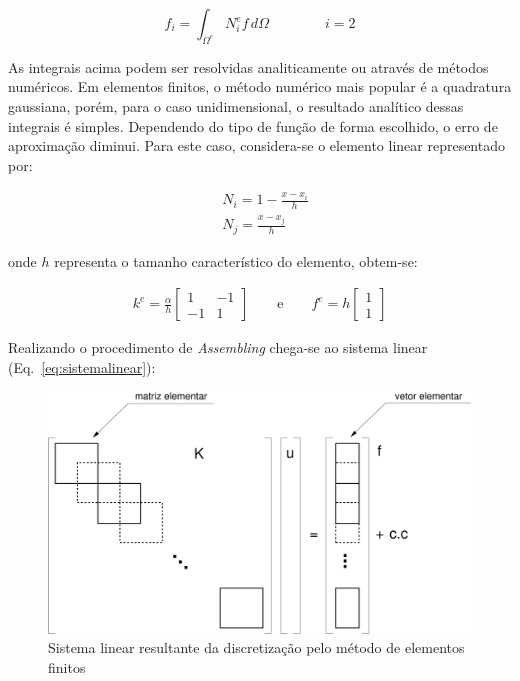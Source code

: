 \begin{equation}
	f_{i} = \int_{\Omega^e} N_i^e f \, d\Omega
	\qquad \qquad
	i=2
\end{equation}

\noindent As integrais acima podem ser resolvidas analiticamente ou
através de métodos numéricos.  Em elementos finitos, o método numérico
mais popular é a quadratura gaussiana, porém, para o caso
unidimensional, o resultado analítico dessas integrais é simples.
Dependendo do tipo de função de forma escolhido, o erro de aproximação
diminui.  Para este caso, considera-se o elemento linear representado
por:

\begin{align}
	&N_i = 1 - \frac{x-x_i}{h}
	\\
	&N_j = \frac{x - x_j}{h} 
\end{align}

\noindent onde $h$ representa o tamanho característico do elemento,
obtem-se:

\begin{gather*}
	k^e 
	= 
	\frac{\alpha}{h}\begin{bmatrix}1 & -1 \\ -1 &1\end{bmatrix}
	\qquad \text{e} \qquad
	f^e 
	=  
	h\begin{bmatrix}1 \\ 1\end{bmatrix}
\end{gather*}

\noindent Realizando o procedimento de \emph{Assembling} chega-se ao
sistema linear (Eq.~\ref{eq:sistemalinear}):

\begin{figure}[h]
	\centering
		 \includegraphics[scale=0.4]{figs/sistema.pdf}
		\caption[Sistema linear do método de elementos finitos]
		{Sistema linear resultante da discretização pelo método 
		de elementos finitos}
	\label{fig:sistema}
\end{figure}

